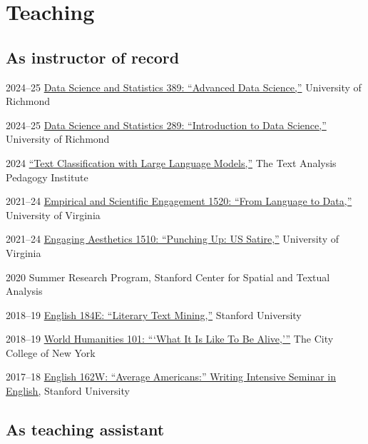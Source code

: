 \documentclass[12pt,letterpaper]{report}
\begin{document}
\section*{Teaching}

\subsection*{As instructor of record}

\begin{tablist}
	\item[2024--25] \tab{}\href{https://fredner.org/teaching}{Data Science and Statistics 389: \enquote{Advanced Data Science,}} University of Richmond
	\item[2024--25] \tab{}\href{https://fredner.org/teaching}{Data Science and Statistics 289: \enquote{Introduction to Data Science,}} University of Richmond
	\item[2024] \tab{}\href{https://fredner.org/teaching}{\enquote{Text Classification with Large Language Models,}} The Text Analysis Pedagogy Institute
	\item[2021--24] \tab{}\href{https://fredner.org/teaching}{Empirical and Scientific Engagement 1520: \enquote{From Language to Data,}} University of Virginia
	\item[2021--24] \tab{}\href{https://fredner.org/teaching}{Engaging Aesthetics 1510: \enquote{Punching Up: US Satire,}} University of Virginia
	\item[2020] \tab{}Summer Research Program, Stanford Center for Spatial and Textual Analysis
	\item[2018--19] \tab{}\href{https://fredner.org/teaching}{English 184E: \enquote{Literary Text Mining,}} Stanford University \\
	\item[2018--19] \tab{}\href{https://fredner.org/teaching}{World Humanities 101: \enquote{\enquote{What It Is Like To Be Alive,}}} The City College of New York
	\item[2017--18] \tab{}\href{https://fredner.org/teaching}{English 162W: \enquote{Average Americans:} Writing Intensive Seminar in English,} Stanford University
\end{tablist}

\subsection*{As teaching assistant}
\end{document}
